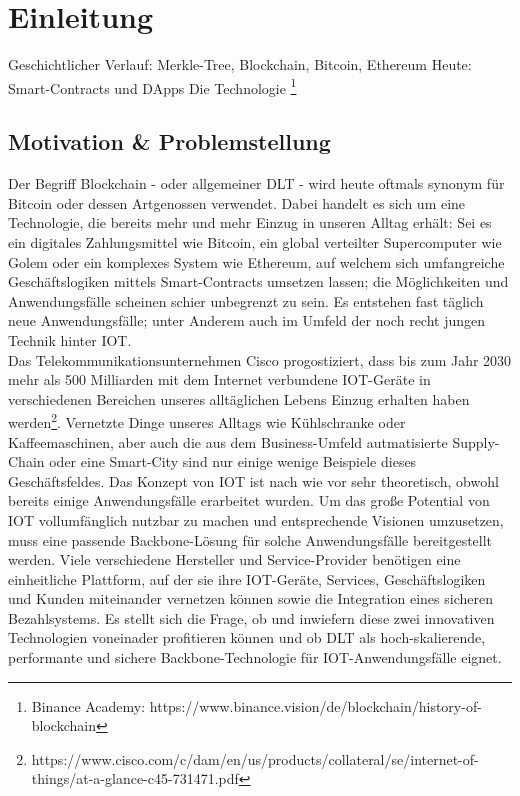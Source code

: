 \chapter{Einleitung}
\label{ch:intro}
Geschichtlicher Verlauf: Merkle-Tree, Blockchain, Bitcoin, Ethereum
Heute: Smart-Contracts und \ac{DApp}s
Die Technologie
\footnote{Binance Academy: https://www.binance.vision/de/blockchain/history-of-blockchain}

%
%
\section{Motivation \& Problemstellung}
\label{sec:intro:motivation}
Der Begriff Blockchain - oder allgemeiner \ac{DLT} - wird heute oftmals synonym für Bitcoin oder dessen Artgenossen verwendet. Dabei handelt es sich um eine Technologie, die bereits mehr und mehr Einzug in unseren Alltag erhält: Sei es ein digitales Zahlungsmittel wie Bitcoin, ein global verteilter Supercomputer wie Golem oder ein komplexes System wie Ethereum, auf welchem sich umfangreiche Geschäftslogiken mittels Smart-Contracts umsetzen lassen; die Möglichkeiten und Anwendungsfälle scheinen schier unbegrenzt zu sein. Es entstehen fast täglich neue Anwendungsfälle; unter Anderem auch im Umfeld der noch recht jungen Technik hinter \ac{IOT}.\\
Das Telekommunikationsunternehmen Cisco progostiziert, dass bis zum Jahr 2030 mehr als 500 Milliarden mit dem Internet verbundene \ac{IOT}-Geräte in verschiedenen Bereichen unseres alltäglichen Lebens Einzug erhalten haben werden\footnote{https://www.cisco.com/c/dam/en/us/products/collateral/se/internet-of-things/at-a-glance-c45-731471.pdf}. Vernetzte Dinge unseres Alltags wie Kühlschranke oder Kaffeemaschinen, aber auch die aus dem Business-Umfeld autmatisierte Supply-Chain oder eine Smart-City sind nur einige wenige Beispiele dieses Geschäftsfeldes. Das Konzept von \ac{IOT} ist nach wie vor sehr theoretisch, obwohl bereits einige Anwendungsfälle erarbeitet wurden. Um das große Potential von \ac{IOT} vollumfänglich nutzbar zu machen und entsprechende Visionen umzusetzen, muss eine passende Backbone-Lösung für solche Anwendungsfälle bereitgestellt werden. Viele verschiedene Hersteller und Service-Provider benötigen eine einheitliche Plattform, auf der sie ihre \ac{IOT}-Geräte, Services, Geschäftslogiken und Kunden miteinander vernetzen können sowie die Integration eines sicheren Bezahlsystems. Es stellt sich die Frage, ob und inwiefern diese zwei innovativen Technologien voneinader profitieren können und ob \ac{DLT} als hoch-skalierende, performante und sichere Backbone-Technologie für \ac{IOT}-Anwendungsfälle eignet.

